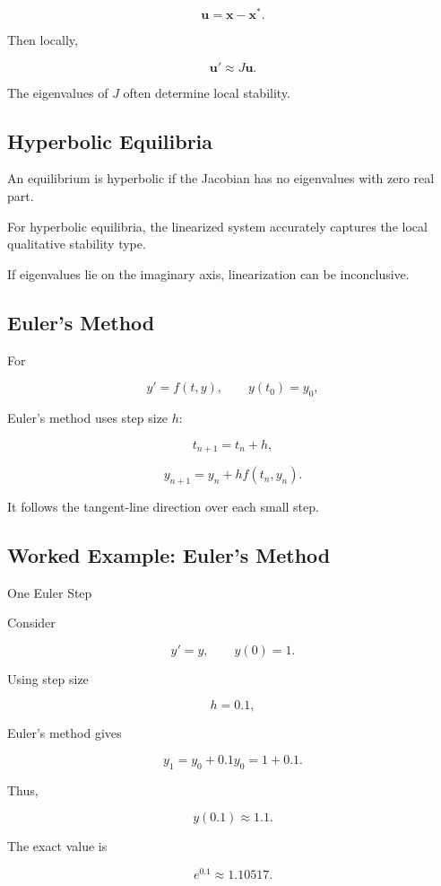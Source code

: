 \[
\mathbf{u}
=
\mathbf{x}
-
\mathbf{x}^*.
\]

Then locally,

\[
\boxed{
\mathbf{u}'
\approx
J\mathbf{u}.
}
\]

The eigenvalues of \(J\) often determine local stability.

\subsection{Hyperbolic Equilibria}
\label{subsec:hyperbolic-equilibria-preview}

An equilibrium is hyperbolic if the Jacobian has no eigenvalues with zero
real part.

For hyperbolic equilibria, the linearized system accurately captures the
local qualitative stability type.

If eigenvalues lie on the imaginary axis, linearization can be
inconclusive.

\subsection{Euler's Method}
\label{subsec:eulers-method}

For

\[
y'
=
f(t,y),
\qquad
y(t_0)=y_0,
\]

Euler's method uses step size \(h\):

\[
\boxed{
t_{n+1}
=
t_n+h,
}
\]

\[
\boxed{
y_{n+1}
=
y_n
+
h
f(t_n,y_n).
}
\]

It follows the tangent-line direction over each small step.

\subsection{Worked Example: Euler's Method}
\label{subsec:worked-euler-method}

\begin{workedexamplebox}{One Euler Step}

Consider

\[
y'=y,
\qquad
y(0)=1.
\]

Using step size

\[
h=0.1,
\]

Euler's method gives

\[
y_1
=
y_0
+
0.1y_0
=
1+0.1.
\]

Thus,

\begin{answerbox}
\[
\boxed{
y(0.1)
\approx
1.1.
}
\]
\end{answerbox}

The exact value is

\[
e^{0.1}
\approx
1.10517.
\]

\end{workedexamplebox}

